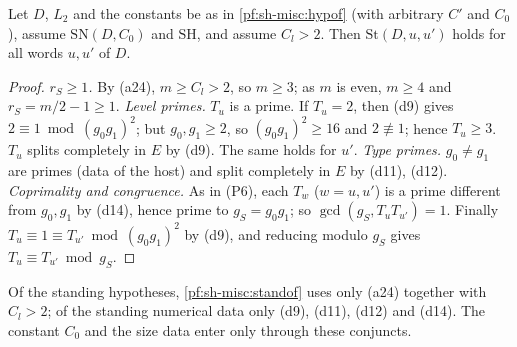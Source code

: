\begin{lemma}\label{pf:sh-misc:standof}
Let $D$, $L_2$ and the constants be as in \cref{pf:sh-misc:hypof} (with arbitrary $C'$ and $C_0$), assume
$\mathrm{SN}(D,C_0)$ and $\mathrm{SH}$, and assume $C_l>2$. Then $\mathrm{St}(D,u,u')$ holds for all words $u,u'$ of $D$.
\end{lemma}

\begin{proof}
\emph{$r_S\ge1$.} By (a24), $m\ge C_l>2$, so $m\ge3$; as $m$ is even, $m\ge4$ and $r_S=m/2-1\ge1$.
\emph{Level primes.} $T_u$ is a prime. If $T_u=2$, then (d9) gives $2\equiv1\bmod(g_0g_1)^2$; but $g_0,g_1\ge2$, so
$(g_0g_1)^2\ge16$ and $2\not\equiv1$; hence $T_u\ge3$. $T_u$ splits completely in $E$ by (d9). The same holds for $u'$.
\emph{Type primes.} $g_0\ne g_1$ are primes (data of the host) and split completely in $E$ by (d11), (d12).
\emph{Coprimality and congruence.} As in (P6), each $T_w$ ($w=u,u'$) is a prime different from $g_0,g_1$ by (d14), hence prime
to $g_S=g_0g_1$; so $\gcd(g_S,T_uT_{u'})=1$. Finally $T_u\equiv1\equiv T_{u'}\bmod(g_0g_1)^2$ by (d9), and reducing modulo $g_S$
gives $T_u\equiv T_{u'}\bmod g_S$.
\end{proof}

\begin{remark}\label{pf:sh-misc:standrem}
Of the standing hypotheses, \cref{pf:sh-misc:standof} uses only (a24) together with $C_l>2$; of the standing numerical data
only (d9), (d11), (d12) and (d14). The constant $C_0$ and the size data enter only through these conjuncts.
\end{remark}

